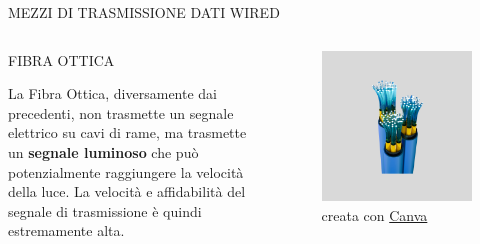 \documentclass[aspectratio=1610]{beamer}
\begin{document}
\begin{frame}{MEZZI DI TRASMISSIONE DATI WIRED}
    \begin{columns}
        \begin{alertblock}{FIBRA OTTICA}
            \begin{minipage}{0.97\linewidth}
                \justifying
                La Fibra Ottica, diversamente dai precedenti, non trasmette un segnale elettrico 
                su cavi di rame, ma trasmette un \textbf{segnale luminoso} che può potenzialmente raggiungere 
                la velocità della luce. La velocità e affidabilità del segnale di trasmissione è quindi 
                estremamente alta.
            \end{minipage}
        \end{alertblock}
           \begin{figure}
               \includegraphics[width=\linewidth]{img/fibra_ottica.png}
               \caption{{creata con \href{https://www.canva.com/}{Canva}}}
           \end{figure}
    \end{columns}
\end{frame}
\end{document}
